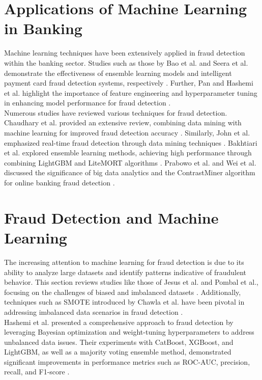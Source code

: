 \documentclass[12pt,a4paper]{report}
\begin{document}
\section{Applications of Machine Learning in Banking}
Machine learning techniques have been extensively applied in fraud detection within the banking sector. Studies such as those by Bao et al. and Seera et al. demonstrate the effectiveness of ensemble learning models and intelligent payment card fraud detection systems, respectively \citep{bao2020detecting, seera2024intelligent}. Further, Pan and Hashemi et al. highlight the importance of feature engineering and hyperparameter tuning in enhancing model performance for fraud detection \citep{pan2024machine, hashemi2022fraud}.\\

Numerous studies have reviewed various techniques for fraud detection. Chaudhary et al. provided an extensive review, combining data mining with machine learning for improved fraud detection accuracy \citep{chaudhary2012review}. Similarly, John et al. emphasized real-time fraud detection through data mining techniques \citep{john2016realtime}. Bakhtiari et al. explored ensemble learning methods, achieving high performance through combining LightGBM and LiteMORT algorithms \citep{bakhtiari2023credit}. Prabowo et al. and Wei et al. discussed the significance of big data analytics and the ContrastMiner algorithm for online banking fraud detection \citep{prabowo2016learning, wei2013effective}.\\

\section{Fraud Detection and Machine Learning}
The increasing attention to machine learning for fraud detection is due to its ability to analyze large datasets and identify patterns indicative of fraudulent behavior. This section reviews studies like those of Jesus et al. and Pombal et al., focusing on the challenges of biased and imbalanced datasets \citep{jesus2022turning, pombal2022understanding}. Additionally, techniques such as SMOTE introduced by Chawla et al. have been pivotal in addressing imbalanced data scenarios in fraud detection \citep{chawla2002smote}.\\

Hashemi et al. presented a comprehensive approach to fraud detection by leveraging Bayesian optimization and weight-tuning hyperparameters to address unbalanced data issues. Their experiments with CatBoost, XGBoost, and LightGBM, as well as a majority voting ensemble method, demonstrated significant improvements in performance metrics such as ROC-AUC, precision, recall, and F1-score \citep[p. 3034]{hashemi2022fraud}.\\
\end{document}
